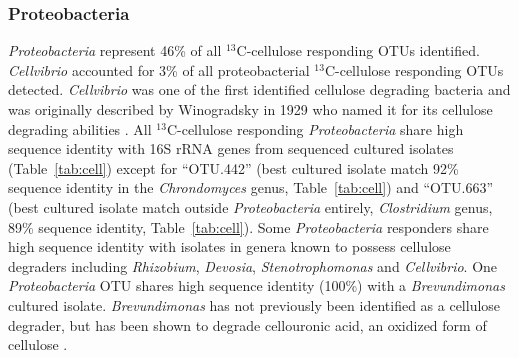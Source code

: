 \subsubsection{Proteobacteria}\label{cell:proteo}
\textit{Proteobacteria} represent 46\% of all $^{13}$C-cellulose responding
OTUs identified. \textit{Cellvibrio} accounted for 3\% of all proteobacterial
$^{13}$C-cellulose responding OTUs detected. \textit{Cellvibrio} was one of the
first identified cellulose degrading bacteria and was originally described by
Winogradsky in 1929 who named it for its cellulose degrading abilities
\citep{boone2001bergeys}. All $^{13}$C-cellulose responding
\textit{Proteobacteria} share high sequence identity with 16S rRNA genes from
sequenced cultured isolates (Table~\ref{tab:cell}) except for ``OTU.442'' (best
cultured isolate match 92\% sequence identity in the \textit{Chrondomyces}
genus, Table~\ref{tab:cell}) and ``OTU.663'' (best cultured isolate match
outside \textit{Proteobacteria} entirely, \textit{Clostridium} genus, 89\%
sequence identity, Table~\ref{tab:cell}). Some \textit{Proteobacteria}
responders share high sequence identity with isolates in genera known to
possess cellulose degraders including \textit{Rhizobium}, \textit{Devosia},
\textit{Stenotrophomonas} and \textit{Cellvibrio}. One \textit{Proteobacteria}
OTU shares high sequence identity (100\%) with a \textit{Brevundimonas} cultured
isolate.  \textit{Brevundimonas} has not previously been identified as a
cellulose degrader, but has been shown to degrade cellouronic acid, an oxidized
form of cellulose \citep{Tavernier_2008}.

